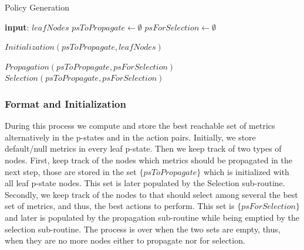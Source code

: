 \begin{algorithm}
\caption{Policy Generation}\label{alg:policy_generation}
\begin{algorithmic}[1]

\State \textbf{input}: $leafNodes$ 
\State $psToPropagate \gets \emptyset$
\State $psForSelection \gets \emptyset$

\State $Initialization(psToPropagate, leafNodes)$

    \State $Propagation(psToPropagate, psForSelection)$
    \State $Selection(psToPropagate, psForSelection)$
\EndWhile

\end{algorithmic}
\end{algorithm}

    \subsubsection{Format and Initialization}

During this process we compute and store the best reachable set of metrics alternatively in the p-states and in the action pairs. Initially, we store default/null metrics in every leaf p-state. Then we keep track of two types of nodes. First, keep track of the nodes which metrics should be propagated in the next step, those are stored in the set $\{psToPropagate\}$ which is initialized with all leaf p-state nodes. This set is later populated by the Selection sub-routine. Secondly, we keep track of the nodes to that should select among several the best set of metrics, and thus, the best actions to perform. This set is $\{psForSelection\}$ and later is populated by the propagation sub-routine while being emptied by the selection sub-routine. The process is over when the two sets are empty, thus, when they are no more nodes either to propagate nor for selection.


